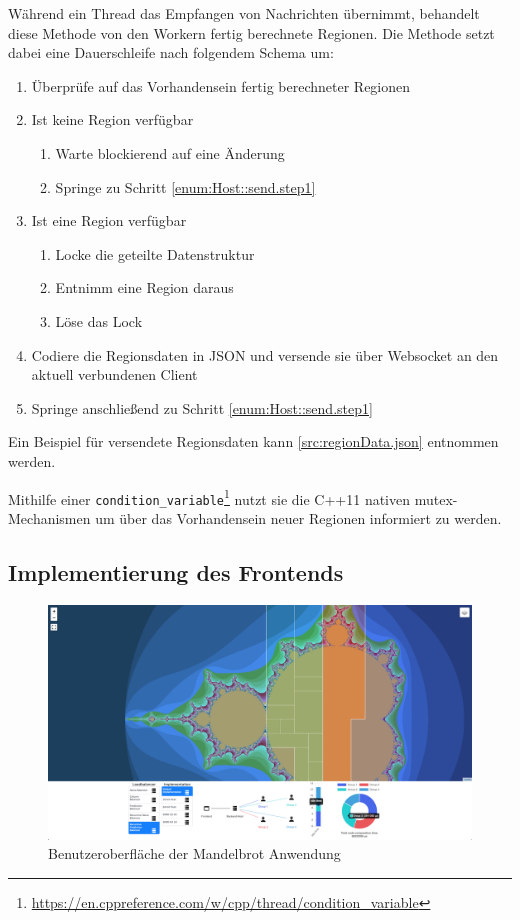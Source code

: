 Während ein Thread das Empfangen von Nachrichten übernimmt, behandelt diese Methode von den Workern fertig berechnete Regionen.
Die Methode setzt dabei eine Dauerschleife nach folgendem Schema um:

\begin{enumerate}
	\item Überprüfe auf das Vorhandensein fertig berechneter Regionen \label{enum:Host::send.step1}
	\item Ist keine Region verfügbar
	      \begin{enumerate}
		      \item Warte blockierend auf eine Änderung
		      \item Springe zu Schritt \ref{enum:Host::send.step1}
	      \end{enumerate}
	\item Ist eine Region verfügbar
	      \begin{enumerate}
		      \item Locke die geteilte Datenstruktur
		      \item Entnimm eine Region daraus
		      \item Löse das Lock
	      \end{enumerate}
	\item Codiere die Regionsdaten in JSON und versende sie über Websocket an den aktuell verbundenen Client
	\item Springe anschließend zu Schritt \ref{enum:Host::send.step1}
\end{enumerate}

Ein Beispiel für versendete Regionsdaten kann \autoref{src:regionData.json} entnommen werden.

Mithilfe einer \texttt{condition\_variable}\footnote{\url{https://en.cppreference.com/w/cpp/thread/condition_variable}}
nutzt sie die C++11 nativen mutex-Mechanismen um über das Vorhandensein neuer Regionen informiert zu werden.

\subsection{Implementierung des Frontends}

\begin{figure}[h!]
	\centering
	\includegraphics[width=\linewidth]{img/Implementierung/UI-Screenshot}
	\caption{Benutzeroberfläche der Mandelbrot Anwendung}
	\label{fig:ui-screenshot}
\end{figure}

